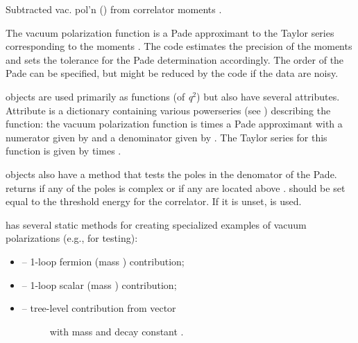 \documentclass[letterpaper,10pt,english]{sphinxmanual}
\begin{document}
\begin{fulllineitems}
\label{g2tools:g2tools.vacpol}
Subtracted vac. pol'n () from correlator moments .

The vacuum polarization function is a Pade approximant to the Taylor
series corresponding to the moments .  The code estimates the
precision of the moments and sets the tolerance for the Pade determination
accordingly. The order  of the Pade can be specified, but might
be reduced by the code if the data are noisy.

{\hyperref[g2tools:g2tools.vacpol]{\emph{}}} objects are used primarily as functions (of \emph{q}$^{\text{2}}$)
but also have several attributes. Attribute  is a dictionary
containing various powerseries (see ) describing the
function: the vacuum polarization function is  times a Pade
approximant  with a numerator given by  and a
denominator  given by . The Taylor series for this
function  is given by  times .

{\hyperref[g2tools:g2tools.vacpol]{\emph{}}} objects also have a method  that
tests the poles in the denomator of the Pade.  returns
 if any of the poles is complex or if any are located above
.  should be set equal to the threshold energy for
the correlator. If it is unset,  is used.

{\hyperref[g2tools:g2tools.vacpol]{\emph{}}} has several static methods for creating specialized
examples of vacuum polarizations (e.g., for testing):
\begin{itemize}
\item {} 
 -- 1-loop fermion (mass ) contribution;

\item {} 
 -- 1-loop scalar (mass ) contribution;

\item {} \begin{description}
\item[{ -- tree-level contribution from vector}] \leavevmode
with mass  and decay constant .


\end{description}
\end{itemize}
\end{fulllineitems}
\end{document}
